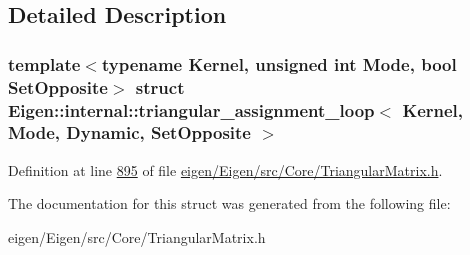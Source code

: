 \subsection{Detailed Description}
\subsubsection*{template$<$typename Kernel, unsigned int Mode, bool Set\+Opposite$>$\newline
struct Eigen\+::internal\+::triangular\+\_\+assignment\+\_\+loop$<$ Kernel, Mode, Dynamic, Set\+Opposite $>$}



Definition at line \hyperlink{eigen_2_eigen_2src_2_core_2_triangular_matrix_8h_source_l00895}{895} of file \hyperlink{eigen_2_eigen_2src_2_core_2_triangular_matrix_8h_source}{eigen/\+Eigen/src/\+Core/\+Triangular\+Matrix.\+h}.



The documentation for this struct was generated from the following file\+:\begin{DoxyCompactItemize}
\item 
eigen/\+Eigen/src/\+Core/\+Triangular\+Matrix.\+h\end{DoxyCompactItemize}
